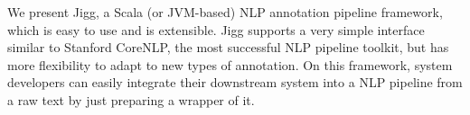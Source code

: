 We present Jigg, a Scala (or JVM-based) NLP annotation pipeline framework, which is easy to use and is extensible. Jigg supports a very simple interface similar to Stanford CoreNLP, the most successful NLP pipeline toolkit, but has more flexibility to adapt to new types of annotation. On this framework, system developers can easily integrate their downstream system into a NLP pipeline from a raw text by just preparing a wrapper of it.
